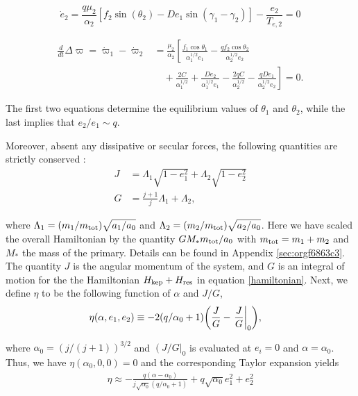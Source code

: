 \documentclass[usenatbib,onecolumn]{mnras}
\DeclarePairedDelimiter{\p}{(}{)}
\begin{document}
\begin{equation}
\label{dote2}
  \dot e_2 = \frac{q\mu_2}{\alpha_2} [f_2\sin(\theta_2) - De_1 \sin(\gamma_1-\gamma_2)]- \frac{e_2}{T_{e,2}}=0
\end{equation}

\begin{align}
\label{dotdpom}
  \frac{d}{dt}\Delta\varpi = \dot\varpi_1-\dot\varpi_2
  &= \frac{\mu_2}{\alpha_2} \left[ \frac{f_1\cos\theta_1}{\alpha_1^{1/2} e_1}
     - \frac{qf_2\cos\theta_2}{\alpha_2^{1/2}e_2}\right.\nonumber \\
  &\quad+ \left.\frac{2C}{\alpha_1^{1/2}} + \frac{De_2}{\alpha_1^{1/2} e_1}
    - \frac{2qC}{\alpha_2^{1/2}} - \frac{qDe_1}{ \alpha_2^{1/2}e_2}\right]=0.
\end{align}

\noindent
The first two equations determine the equilibrium values of \(\theta_1\)
and \(\theta_2\), while the last implies that \(e_2/e_1 \sim q\).

Moreover, absent any dissipative or secular forces, the following
quantities are strictly conserved \citep{xu_migration_2018}:
\begin{align}
  J &= \Lambda_1\sqrt{1-e_1^2} + \Lambda_2\sqrt{1-e_2^2}\\
  G &= \frac{j+1}{j} \Lambda_1 + \Lambda_2,
\end{align}

\noindent where \(\Lambda_1 = (m_1/m_{\rm
tot})\sqrt{a_1/a_0}\) and \(\Lambda_2=(m_2/m_{\rm tot})\sqrt{a_2/a_0}\).
Here we have scaled the overall Hamiltonian by the quantity
\(GM_*m_{\rm tot}/a_0\) with \(m_{\rm tot}=m_1+m_2\) and \(M_*\) the mass of
the primary. Details can be found in Appendix \ref{sec:orgf6863c3}. The quantity \(J\) is the angular
momentum of the system, and \(G\) is an integral of motion for the the
Hamiltonian \(H_{\rm kep}+H_{\rm res}\) in equation \eqref{hamiltonian}.
Next, we define \(\eta\) to be the following function of \(\alpha\) and \(J/G\),
\begin{align}
  \eta(\alpha, e_1, e_2) &\equiv - 2(q/\alpha_0+1)\p*{\frac{J}{G}-\left.\frac{J}{G}\right|_{0}},
\end{align}

\noindent
where \(\alpha_0 = (j/(j+1))^{3/2}\) and \(\left(J/G\right|_{0}\) is
evaluated at \(e_i=0\) and \(\alpha=\alpha_0\).
Thus, we have \(\eta(\alpha_0, 0, 0)=0\) and the corresponding Taylor expansion yields
\begin{align}
  \eta \approx -\frac{q(\alpha-\alpha_0)}{j\sqrt{\alpha_0}(q/\alpha_0+1)} + q\sqrt{\alpha_0}e_1^2 + e_2^2
\end{align}
\end{document}
